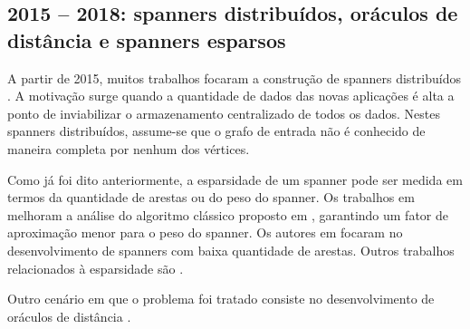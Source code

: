 \subsection{2015 -- 2018: spanners distribuídos, oráculos de distância e spanners esparsos}

  A partir de 2015, muitos trabalhos focaram a construção de spanners
  distribuídos \cite{KlauckNPR2015,Censor-HillelKPY2016,ElkinN2017,GrossmanP2017}.
  A motivação surge quando a quantidade de dados das novas aplicações é alta a
  ponto de inviabilizar o armazenamento centralizado de todos os dados. Nestes
  spanners distribuídos, assume-se que o grafo de entrada não é conhecido de
  maneira completa por nenhum dos vértices.

  Como já foi dito anteriormente, a esparsidade de um spanner pode ser medida
  em termos da quantidade de arestas
  ou do peso do spanner. Os trabalhos em \cite{ElkinNS2015,ChechikWN2016}
  melhoram a análise do algoritmo clássico proposto em \cite{AlthoferDDJS1993},
  garantindo um fator de aproximação menor para o peso do spanner.
  Os autores em \cite{BodwinW2015,ElkinN2017} focaram no desenvolvimento de
  spanners com baixa quantidade de arestas. Outros trabalhos relacionados à
  esparsidade são \cite{BodwinW2015,BorradaileLW2017}.

  Outro cenário em que o problema foi tratado consiste no desenvolvimento
  de oráculos de distância \cite{ElkinP2016,Sommer2016,Knudsen2017}.
  


 


